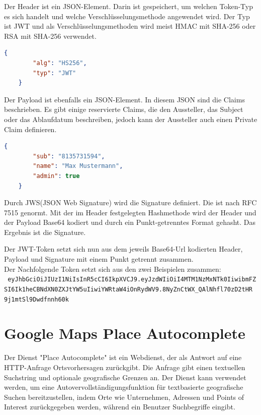 Der Header ist ein JSON-Element. Darin ist gespeichert, um welchen Token-Typ es sich handelt und welche Verschlüsselungsmethode angewendet wird. Der Typ ist JWT und als Verschlüsselungsmethoden wird meist HMAC mit SHA-256 oder RSA mit SHA-256 verwendet. \autocite{wikiJWT} \\
\begin{lstlisting}[caption={JWT-Header Beispiel}, language=json]
	{
		"alg": "HS256",
		"typ": "JWT"
	}
\end{lstlisting}
\newpage
Der Payload ist ebenfalls ein JSON-Element. In diesem JSON sind die Claims beschrieben. Es gibt einige reservierte Claims, die den Aussteller, das Subject oder das Ablaufdatum beschreiben, jedoch kann der Aussteller auch einen Private Claim definieren. \autocite{wikiJWT} \\
\begin{lstlisting}[caption={JWT-Payload Beispiel}, language=json]
	{
		"sub": "8135731594",
		"name": "Max Mustermann",
		"admin": true
	}
\end{lstlisting}

Durch JWS(JSON Web Signature) wird die Signature definiert. Die ist nach RFC 7515 genormt. Mit der im Header festgelegten Hashmethode wird der Header und der Payload Base64 kodiert und durch ein Punkt-getrenntes Format gehasht. Das Ergebnis ist die Signature. \autocite{wikiJWT}

Der JWT-Token setzt sich nun aus dem jeweils Base64-Url kodierten Header, Payload und Signature mit einem Punkt getrennt zusammen. \autocite{wikiJWT} \\
Der Nachfolgende Token setzt sich aus den zwei Beispielen zusammen:\\
\texttt{
	eyJhbGciOiJIUzI1NiIsInR5cCI6IkpXVCJ9.eyJzdWIiOiI4MTM1NzMxNTk0IiwibmFZ\\SI6Ik1heCBNdXN0ZXJtYW5uIiwiYWRtaW4iOnRydWV9.8NyZnCtWX\_QAlNhfl70zD2tHR\\9j1mtSl9Dwdfnnh60k
}

\section{Google Maps Place Autocomplete}

Der Dienst "Place Autocomplete" ist ein Webdienst, der als Antwort auf eine HTTP-Anfrage Ortsvorhersagen zurückgibt. Die Anfrage gibt einen textuellen Suchstring und optionale geografische Grenzen an. Der Dienst kann verwendet werden, um eine Autovervollständigungsfunktion für textbasierte geografische Suchen bereitzustellen, indem Orte wie Unternehmen, Adressen und Points of Interest zurückgegeben werden, während ein Benutzer Suchbegriffe eingibt.\cite{googlePlacesAPI}

